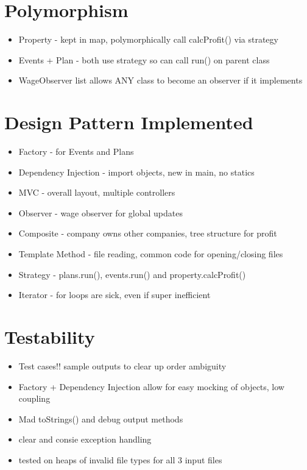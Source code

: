 \documentclass[]{article}
\begin{document}

\vspace*{0.8cm}
\section*{Polymorphism}

\begin{itemize}
	\item Property - kept in map, polymorphically call calcProfit() via strategy
	\item Events + Plan - both use strategy so can call run() on parent class
	\item WageObserver list allows ANY class to become an observer if it implements
\end{itemize}


\section*{Design Pattern Implemented}

\begin{itemize}
	\item Factory - for Events and Plans
	\item Dependency Injection - import objects, new in main, no statics
	\item MVC - overall layout, multiple controllers
	\item Observer - wage observer for global updates
	\item Composite - company owns other companies, tree structure for profit
	\item Template Method - file reading, common code for opening/closing files
	\item Strategy - plans.run(), events.run() and property.calcProfit()
	\item Iterator - for loops are sick, even if super inefficient
\end{itemize}


\section*{Testability}

\begin{itemize}
	\item Test cases!! sample outputs to clear up order ambiguity
	\item Factory  + Dependency Injection allow for easy mocking of objects, low coupling
	\item Mad toStrings() and debug output methods
	\item clear and consie exception handling
	\item tested on heaps of invalid file types for all 3 input files
\end{itemize}
\end{document}
